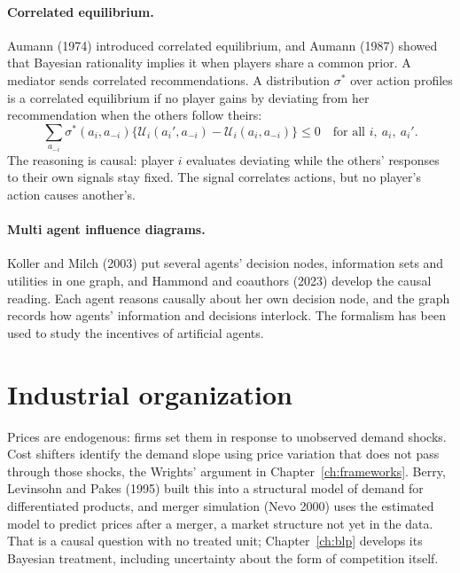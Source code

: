\paragraph{Correlated equilibrium.} Aumann (1974) introduced correlated equilibrium, and Aumann (1987) showed that Bayesian rationality implies it when players share a common prior. A mediator sends correlated recommendations. A distribution $\sigma^\ast$ over action profiles is a correlated equilibrium if no player gains by deviating from her recommendation when the others follow theirs:
\[
\sum_{a_{-i}} \sigma^\ast(a_i, a_{-i})\bigl\{\mathcal{U}_i(a_i', a_{-i}) - \mathcal{U}_i(a_i, a_{-i})\bigr\} \le 0
\quad \text{for all } i,\ a_i,\ a_i'.
\]
The reasoning is causal: player $i$ evaluates deviating while the others' responses to their own signals stay fixed. The signal correlates actions, but no player's action causes another's.

\paragraph{Multi agent influence diagrams.} Koller and Milch (2003) put several agents' decision nodes, information sets and utilities in one graph, and Hammond and coauthors (2023) develop the causal reading. Each agent reasons causally about her own decision node, and the graph records how agents' information and decisions interlock. The formalism has been used to study the incentives of artificial agents.

\section{Industrial organization}\label{cdt:sec:io}

Prices are endogenous: firms set them in response to unobserved demand shocks. Cost shifters identify the demand slope using price variation that does not pass through those shocks, the Wrights' argument in Chapter~\ref{ch:frameworks}. Berry, Levinsohn and Pakes (1995) built this into a structural model of demand for differentiated products, and merger simulation (Nevo 2000) uses the estimated model to predict prices after a merger, a market structure not yet in the data. That is a causal question with no treated unit; Chapter~\ref{ch:blp} develops its Bayesian treatment, including uncertainty about the form of competition itself.

